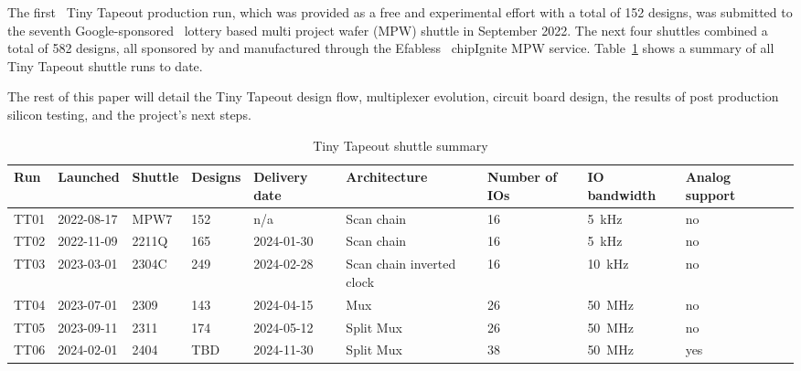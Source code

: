 The first~\cite{firstshuttle} Tiny Tapeout production run, which was provided as a free and experimental effort with a total of 152 designs, was submitted to the seventh Google-sponsored~\cite{googlesponsored} lottery based multi project wafer (MPW) shuttle in September 2022.
The next four shuttles combined a total of 582 designs, all sponsored by and manufactured through the Efabless~\cite{efabless} chipIgnite MPW service. Table~\ref{tab:tinytapeout} shows a summary of all Tiny Tapeout shuttle runs to date.

The rest of this paper will detail the Tiny Tapeout design flow, multiplexer evolution, circuit board design, the results of post production silicon testing, and the project's next steps.

\begin{table}[!t]
\centering
\caption{Tiny Tapeout shuttle summary}
\label{tab:tinytapeout}
\begin{tabularx}{\textwidth}{@{}l *{9}{X}@{}}
\toprule
\textbf{Run} & \textbf{Launched} & \textbf{Shuttle} & \textbf{Designs} & \textbf{Delivery date} & \textbf{Architecture} & \textbf{Number of IOs} & \textbf{IO bandwidth} & \textbf{Analog support} \\
\midrule
TT01 & 2022-08-17  & MPW7  & 152 & n/a        & Scan chain                & 16 & \qty{5}{\kHz}    & no  \\
TT02 & 2022-11-09  & 2211Q & 165 & 2024-01-30 & Scan chain                & 16 & \qty{5}{\kHz}    & no  \\
TT03 & 2023-03-01  & 2304C & 249 & 2024-02-28 & Scan chain inverted clock & 16 & \qty{10}{\kHz}    & no  \\
TT04 & 2023-07-01  & 2309  & 143 & 2024-04-15 & Mux                       & 26 & \qty{50}{\MHz}   & no  \\
TT05 & 2023-09-11  & 2311  & 174 & 2024-05-12 & Split Mux                 & 26 & \qty{50}{\MHz}   & no  \\
TT06 & 2024-02-01  & 2404  & TBD & 2024-11-30 & Split Mux                 & 38 & \qty{50}{\MHz}   & yes \\
\bottomrule
\end{tabularx}
\end{table}

